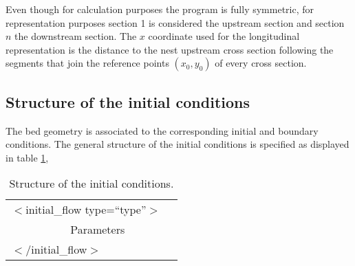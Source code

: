 \documentclass[a4paper,12pt]{article}
\newcommand{\TABLE}[4]
{
	\begin{table}[ht!]\centering
	\begin{tabular}{#1}\hline#2\\\hline\end{tabular}
	\caption{#3.\label{#4}}\end{table}
}
\begin{document}
Even though for calculation purposes the program is fully symmetric, for
representation purposes section 1 is considered the upstream section and section
$n$ the downstream section. The $x$ coordinate used for the longitudinal
representation is the distance to the nest upstream cross section following the
segments that join the reference points $(x_0,y_0)$ of every cross section.

\subsection{Structure of the initial conditions}

The bed geometry is associated to the corresponding initial and boundary conditions. The general structure of the initial conditions is
specified as displayed in table \ref{TabFCI},
\TABLE{ccc}
{
	\multicolumn{2}{l}{$<$initial\_flow type=``type''$>$}\\
	&Parameters\\
	\multicolumn{2}{l}{$<$/initial\_flow$>$}
}
{Structure of the initial conditions}{TabFCI}
\end{document}

